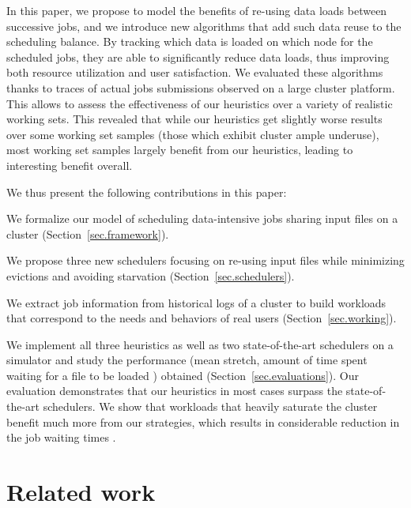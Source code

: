 \documentclass[sigconf,review,anonymous]{acmart}
\newcommand{\rev}[1]{{\color{black}{#1}}}
\begin{document}
In this paper, we propose to model the benefits of re-using data loads
between successive jobs, and we introduce new algorithms that add such
data reuse to the scheduling balance. By tracking which data is loaded
on which node for the scheduled jobs, they are able to significantly
reduce data loads, thus improving both resource utilization and user
satisfaction. We evaluated these algorithms thanks to traces of actual
jobs submissions observed on a large cluster platform. This allows to
assess the effectiveness of our heuristics over a variety of realistic
working sets. This revealed that while our heuristics get slightly worse
results over some working set samples (those which exhibit cluster ample
underuse), most working set samples largely benefit from our heuristics,
leading to interesting benefit overall.

We thus present the following contributions in this paper:
\begin{compactenum}
	\item We formalize our model of scheduling data-intensive jobs sharing input files on a cluster (Section~\ref{sec.framework}).
	\item We propose three new schedulers focusing on re-using input files while minimizing evictions and avoiding starvation (Section~\ref{sec.schedulers}).
	\item We extract job information from historical logs of a cluster to build workloads that correspond to the needs and behaviors of real users (Section~\ref{sec.working}).
	\item We implement all three heuristics as well as two state-of-the-art schedulers on a simulator and study the performance (mean stretch, amount of time spent waiting for a file to be loaded \rev{and number of core hours}) obtained \rev{after scheduling almost 2 millions jobs} (Section~\ref{sec.evaluations}).
	Our evaluation demonstrates that our heuristics in most cases surpass the state-of-the-art schedulers.
	We show that workloads that heavily saturate the cluster
    benefit much more from our strategies, which results in
    considerable reduction in the job waiting times \rev{as well as the total core hours}.
\end{compactenum}
\rev{We used simulations to avoid dirupting users on a production
cluster, but our strategies could be implemented on the Slurm workload
by asking the users to flag the input files they are using.}

\section{Related work}\label{sec.related_work}
\end{document}
